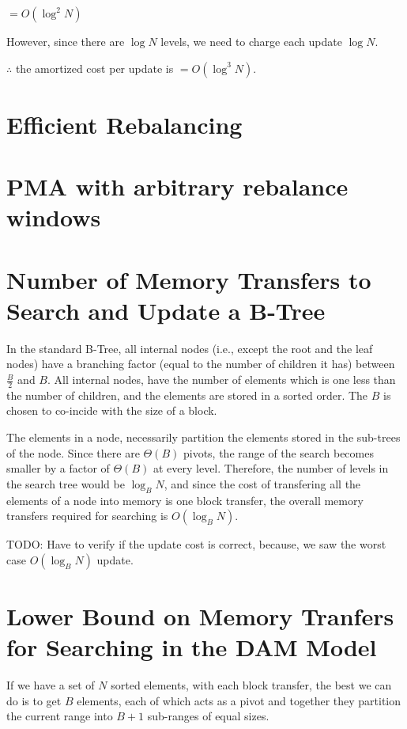 \documentclass{article}
\begin{document}
$= O(\log^2{N})$

However, since there are $\log{N}$ levels, we need to charge each update $\log{N}$.

$\therefore$ the amortized cost per update is $= O(\log^3{N})$.


\section{Efficient Rebalancing}

\section{PMA with arbitrary rebalance windows}

\clearpage


\section {Number of Memory Transfers to Search and Update a B-Tree}
In the standard B-Tree, all internal nodes (i.e., except the root and 
the leaf nodes) have a branching factor (equal to the number of children it has) 
between $\frac{B}{2}$ and $B$. All internal nodes, have the number of
elements which is one less than the number of children, and the elements
are stored in a sorted order. The $B$ is chosen to co-incide with the size of
a block.

The elements in a node, necessarily partition
the elements stored in the sub-trees of the node. Since there are $\Theta(B)$
pivots, the range of the search becomes smaller by a factor of $\Theta(B)$ at
every level. Therefore, the number of levels in the search tree would be 
$\log_B{N}$, and since the cost of transfering all the elements of a node into
memory is one block transfer, the overall memory transfers required for searching
is $O(\log_B{N})$.

TODO: Have to verify if the update cost is correct, because, we saw the worst
case $O(\log_B{N})$ update.

\clearpage 

\section {Lower Bound on Memory Tranfers for Searching in the DAM Model}
If we have a set of $N$ sorted elements, with each block transfer, the best we can
do is to get $B$ elements, each of which acts as a pivot and together they partition
the current range into $B+1$ sub-ranges of equal sizes. 
\end{document}
